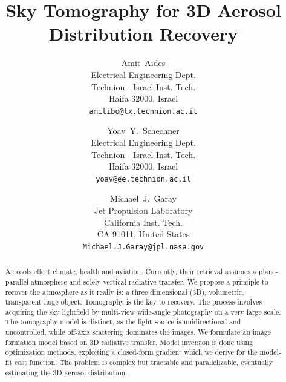 \documentclass[10pt,twocolumn,letterpaper]{article}
\begin{document}
\title{Sky Tomography for 3D Aerosol Distribution Recovery}

\author{Amit~Aides\\
Electrical Engineering Dept.\\
Technion - Israel Inst. Tech.\\
Haifa 32000, Israel\\
{\tt\small amitibo@tx.technion.ac.il}
\and
Yoav~Y.~Schechner\\
Electrical Engineering Dept.\\
Technion - Israel Inst. Tech.\\
Haifa 32000, Israel\\
{\tt\small yoav@ee.technion.ac.il}
\and
Michael~J.~Garay\\
Jet Propulsion Laboratory\\
California Inst. Tech.\\
CA 91011, United States\\
{\tt\small Michael.J.Garay@jpl.nasa.gov}
}

\maketitle
\thispagestyle{empty}

\begin{abstract}
  Aerosols effect climate, health and aviation.  Currently, their
  retrieval assumes a plane-parallel atmosphere and solely
  vertical radiative transfer. We propose a principle to recover the
  atmosphere as it really is: a three dimensional (3D), volumetric, transparent
  huge object. Tomography is the key to recovery. The process involves
  acquiring the sky lightfield by multi-view wide-angle photography on
  a very large scale. The tomography model is distinct, as the light source
  is unidirectional and uncontrolled, while off-axis scattering dominates
  the images.  We formulate an image formation model based on 3D
  radiative transfer. Model inversion is done using optimization methods, exploiting a closed-form gradient which we derive for the model-fit cost function. The problem is complex but tractable and parallelizable, eventually estimating the 3D aerosol distribution.
\end{abstract}
\end{document}
